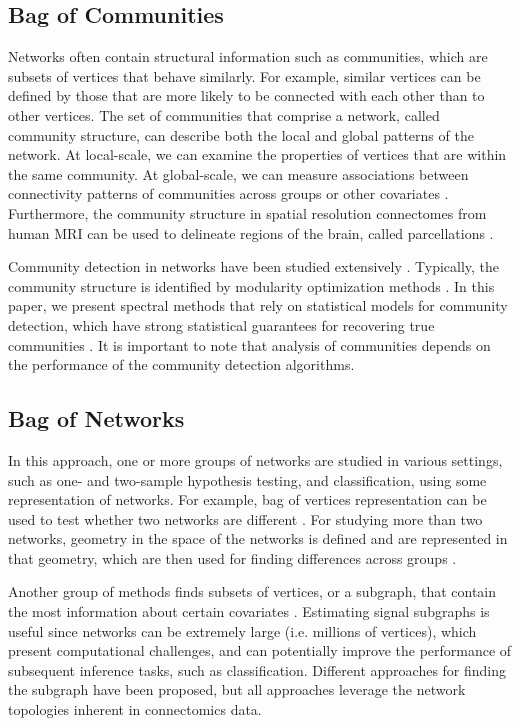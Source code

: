 \subsection{Bag of Communities}
Networks often contain structural information such as communities, which are subsets of vertices that behave similarly. For example, similar vertices can be defined by those that are more likely to be connected with each other than to other vertices.
The set of communities that comprise a network, called community structure, can describe both the local and global patterns of the network. At local-scale, we can examine the properties of vertices that are within the same community. At global-scale, we can measure associations between connectivity patterns of communities across groups or other covariates \cite{faskowitz2018weighted, kim2019graph, arroyo2020simultaneous}. Furthermore, the community structure in spatial resolution connectomes from human MRI can be used to delineate regions of the brain, called parcellations \cite{thirion2014fmri}.

Community detection in networks have been studied extensively \cite{newman2013spectral, fortunato2016community}. Typically, the community structure is identified by modularity optimization methods \cite{clauset2004finding, blondel2008fast}. In this paper, we present spectral methods that rely on statistical models for community detection, which have strong statistical guarantees for recovering true communities \cite{sussman2012consistent, lyzinski2016community, athreya2017statistical, arroyo2019inference}.
It is important to note that analysis of communities depends on the performance of the community detection algorithms.

\subsection{Bag of Networks}
In this approach, one or more groups of networks are studied in various settings, such as one- and two-sample hypothesis testing, and classification, using some representation of networks. For example, bag of vertices representation can be used to test whether two networks are different \cite{tang2017nonparametric, tang2017semiparametric}. For studying more than two networks, geometry in the space of the networks is defined and are represented in that geometry, which are then used for finding differences across groups \cite{ginestet2017hypothesis, xia2019matrix, arroyo2019inference}.

Another group of methods finds subsets of vertices, or a subgraph, that contain the most information about certain covariates \cite{vogelstein2012graph, wang2018signal,  relion2019network, wang2019symmetric, guha2020bayesian}. Estimating signal subgraphs is useful since networks can be extremely large (i.e. millions of vertices), which present computational challenges, and can potentially improve the performance of subsequent inference tasks, such as classification. 
Different approaches for finding the subgraph have been proposed, but all approaches leverage the network topologies inherent in connectomics data. 
